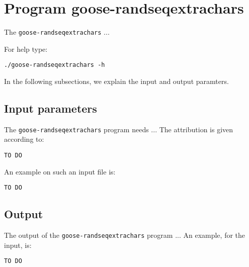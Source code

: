 \section{Program goose-randseqextrachars}
The \texttt{goose-randseqextrachars} ...

For help type:
\begin{lstlisting}
./goose-randseqextrachars -h
\end{lstlisting}
In the following subsections, we explain the input and output paramters.

\subsection{Input parameters}

The \texttt{goose-randseqextrachars} program needs ...
The attribution is given according to:
\begin{lstlisting}
TO DO
\end{lstlisting}

An example on such an input file is:
\begin{lstlisting}
TO DO
\end{lstlisting}

\subsection{Output}
The output of the \texttt{goose-randseqextrachars} program ...
An example, for the input, is:
\begin{lstlisting}
TO DO
\end{lstlisting}